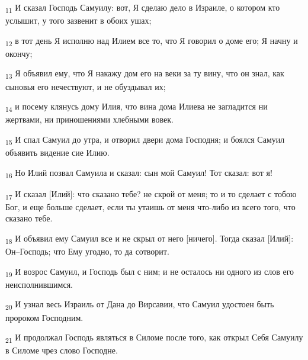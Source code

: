 \begin{tcolorbox}
\textsubscript{11} И сказал Господь Самуилу: вот, Я сделаю дело в Израиле, о котором кто услышит, у того зазвенит в обоих ушах;
\end{tcolorbox}
\begin{tcolorbox}
\textsubscript{12} в тот день Я исполню над Илием все то, что Я говорил о доме его; Я начну и окончу;
\end{tcolorbox}
\begin{tcolorbox}
\textsubscript{13} Я объявил ему, что Я накажу дом его на веки за ту вину, что он знал, как сыновья его нечествуют, и не обуздывал их;
\end{tcolorbox}
\begin{tcolorbox}
\textsubscript{14} и посему клянусь дому Илия, что вина дома Илиева не загладится ни жертвами, ни приношениями хлебными вовек.
\end{tcolorbox}
\begin{tcolorbox}
\textsubscript{15} И спал Самуил до утра, и отворил двери дома Господня; и боялся Самуил объявить видение сие Илию.
\end{tcolorbox}
\begin{tcolorbox}
\textsubscript{16} Но Илий позвал Самуила и сказал: сын мой Самуил! Тот сказал: вот я!
\end{tcolorbox}
\begin{tcolorbox}
\textsubscript{17} И сказал [Илий]: что сказано тебе? не скрой от меня; то и то сделает с тобою Бог, и еще больше сделает, если ты утаишь от меня что-либо из всего того, что сказано тебе.
\end{tcolorbox}
\begin{tcolorbox}
\textsubscript{18} И объявил ему Самуил все и не скрыл от него [ничего]. Тогда сказал [Илий]: Он--Господь; что Ему угодно, то да сотворит.
\end{tcolorbox}
\begin{tcolorbox}
\textsubscript{19} И возрос Самуил, и Господь был с ним; и не осталось ни одного из слов его неисполнившимся.
\end{tcolorbox}
\begin{tcolorbox}
\textsubscript{20} И узнал весь Израиль от Дана до Вирсавии, что Самуил удостоен быть пророком Господним.
\end{tcolorbox}
\begin{tcolorbox}
\textsubscript{21} И продолжал Господь являться в Силоме после того, как открыл Себя Самуилу в Силоме чрез слово Господне.
\end{tcolorbox}
